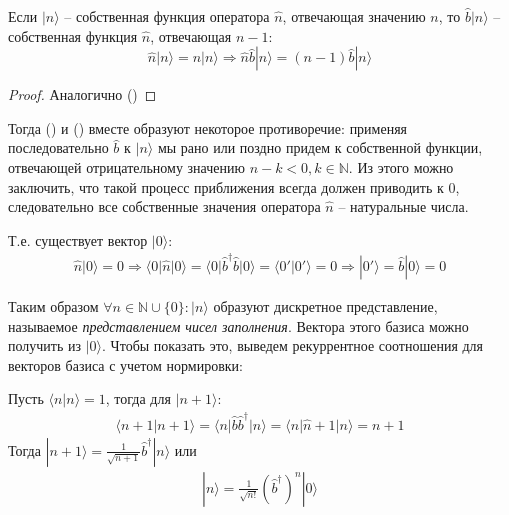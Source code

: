 \documentclass[__main__.tex]{subfiles}
\begin{document}
\begin{theorem}
	Если $|n\rangle$ -- собственная функция оператора $\hat{n}$, отвечающая значению $n$, то $\hat{b}|n\rangle$ -- собственная функция $\hat{n}$, отвечающая $n-1$:
	$$
	\hat{n}|n\rangle=n|n\rangle\Longrightarrow\hat{n}\hat{b}|n\rangle=(n-1)\hat{b}|n\rangle
	$$
\end{theorem}
\begin{proof}
	Аналогично ()
\end{proof}
Тогда () и () вместе образуют некоторое противоречие: применяя последовательно $\hat{b}$ к $|n\rangle$ мы рано или поздно придем к собственной функции, отвечающей отрицательному значению $n-k<0,k\in\mathbb{N}$. Из этого можно заключить, что такой процесс приближения всегда должен приводить к $0$, следовательно все собственные значения оператора $\hat{n}$ -- натуральные числа.

Т.е. существует вектор $|0\rangle$:
\begin{gather*}
\hat{n}|0\rangle = 0
\Longrightarrow
\langle 0|\hat{n}|0\rangle = \langle 0|\hat{b}^\dagger\hat{b}|0\rangle = \langle 0'|0'\rangle = 0
\Longrightarrow
|0'\rangle = \hat{b}|0\rangle = 0
\end{gather*}

Таким образом $\forall n\in\mathbb{N}\cup\{0\}\colon|n\rangle$ образуют дискретное представление, называемое \textit{представлением чисел заполнения}. Вектора этого базиса можно получить из $|0\rangle$. Чтобы показать это, выведем рекуррентное соотношения для векторов базиса с учетом нормировки:

Пусть $\langle n|n\rangle=1$, тогда для $|n+1\rangle$:
\begin{gather*}
\langle n+1|n+1\rangle = \langle n|\hat{b}\hat{b}^\dagger|n\rangle = \langle n|\hat{n}+1|n\rangle
= n+1
\end{gather*}
Тогда $|n+1\rangle = \frac{1}{\sqrt{n+1}}\hat{b}^\dagger|n\rangle$ или
\begin{gather*}
|n\rangle = \frac{1}{\sqrt{n!}}\left(\hat{b}^\dagger\right)^n|0\rangle
\end{gather*}
\end{document}
